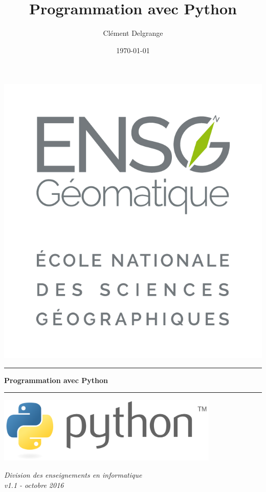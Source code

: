 \documentclass[12pt, a4paper]{article}
\title{Programmation avec Python}
\author{Clément Delgrange}
\date{\today}
\begin{document}
\begin{titlepage}
	\begin{sffamily}
		\begin{flushleft}
			\includegraphics[scale=0.15]{img/logos/logo_ensg.png}\\[1.5cm]
		\end{flushleft}
		\begin{flushright}
		\end{flushright}
		
		\vspace{1cm}
		
		\begin{center}
			\hrule
				\vspace{0.5cm}
				{\huge \bfseries Programmation avec Python}
				\vspace{0.7cm}
			\hrule
			
			\vspace{3.5cm}
			\includegraphics[width=400px]{img/logo_python.png}
			\vspace{5cm}
		
			\large \textit{Division des enseignements en informatique}\\
			\small \textit{v1.1 - octobre 2016}
		\end{center}
	\end{sffamily}
\end{titlepage}
\end{document}
